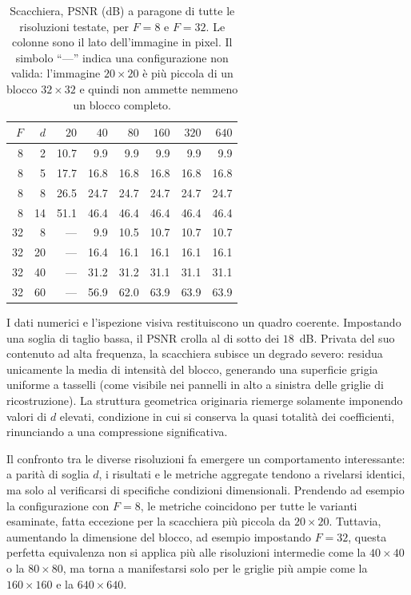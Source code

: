 \documentclass[11pt,a4paper]{article}
\begin{document}
\begin{table}[H]
\centering
\footnotesize
\setlength{\tabcolsep}{4pt}
\caption{Scacchiera, PSNR (dB) a paragone di tutte le risoluzioni testate,
per $F=8$ e $F=32$. Le colonne sono il lato dell'immagine in pixel.
Il simbolo ``---'' indica una configurazione non valida: l'immagine
$20\times20$ è più piccola di un blocco $32\times32$ e quindi non ammette
nemmeno un blocco completo.}
\label{tab:scac}
\begin{tabular}{rrrrrrrr}
\toprule
$F$ & $d$ & $20$ & $40$ & $80$ & $160$ & $320$ & $640$ \\
\midrule
8  & 2  & 10.7 & 9.9  & 9.9  & 9.9  & 9.9  & 9.9  \\
8  & 5  & 17.7 & 16.8 & 16.8 & 16.8 & 16.8 & 16.8 \\
8  & 8  & 26.5 & 24.7 & 24.7 & 24.7 & 24.7 & 24.7 \\
8  & 14 & 51.1 & 46.4 & 46.4 & 46.4 & 46.4 & 46.4 \\
\midrule
32 & 8  & --- & 9.9  & 10.5 & 10.7 & 10.7 & 10.7 \\
32 & 20 & --- & 16.4 & 16.1 & 16.1 & 16.1 & 16.1 \\
32 & 40 & --- & 31.2 & 31.2 & 31.1 & 31.1 & 31.1 \\
32 & 60 & --- & 56.9 & 62.0 & 63.9 & 63.9 & 63.9 \\
\bottomrule
\end{tabular}
\end{table}

I dati numerici e l'ispezione visiva restituiscono un quadro coerente. Impostando una soglia di taglio bassa, il 
PSNR crolla al di sotto dei $18$~dB. 
Privata del suo contenuto ad alta frequenza, la scacchiera subisce un degrado severo: residua unicamente 
la media di intensità del blocco, generando una superficie grigia uniforme a tasselli 
(come visibile nei pannelli in alto a sinistra delle griglie di ricostruzione). 
La struttura geometrica originaria riemerge solamente imponendo valori di $d$ elevati, 
condizione in cui si conserva la quasi totalità dei coefficienti, 
rinunciando a una compressione significativa.

Il confronto tra le diverse risoluzioni fa emergere un comportamento interessante: a parità di soglia $d$, 
i risultati e le metriche aggregate tendono a rivelarsi identici, ma solo al verificarsi di specifiche 
condizioni dimensionali. Prendendo ad esempio la configurazione con $F=8$, 
le metriche coincidono per tutte le varianti esaminate, fatta eccezione per la scacchiera 
più piccola da $20 \times 20$. 
Tuttavia, aumentando la dimensione del blocco, ad esempio impostando $F=32$, 
questa perfetta equivalenza non si applica più alle risoluzioni intermedie come la $40 \times 40$ o la $80 \times 80$, 
ma torna a manifestarsi solo per le griglie più ampie come la $160 \times 160$ e la $640 \times 640$.
\end{document}
